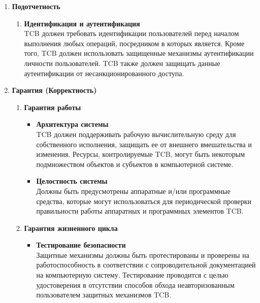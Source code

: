 \begin{enumerate}
\begin{enumerate}
\begin{enumerate}
\begin{enumerate}
				(\textit{напр.} self/group/other контроль, ACL) должны позволять пользователям определять и контролировать общий доступ к объектам именованными субъектами и/или определенной группой
				субъектов.
			\end{enumerate}
			\item{\textbf{Подотчетность}}
			\begin{enumerate}
				\item{\textbf{Идентификация и аутентификация}}\\
				TCB должен требовать идентификации пользователей перед началом выполнения любых операций, посредником в которых является. Кроме того, TCB должен использовать защищенные механизмы
				аутентификации личности пользователей. TCB также должен защищать данные аутентификации от несанкционированного доступа.
			\end{enumerate}
			\item{\textbf{Гарантия (Корректность)}}
			\begin{enumerate}
				\item{\textbf{Гарантия работы}}
				\begin{itemize}
					\item{\textbf{Архитектура системы}}\\
					TCB должен поддерживать рабочую вычислительную среду для собственного исполнения, защищать ее от внешнего вмешательства и изменения. Ресурсы, контролируемые TCB, могут быть
					некоторым подмножеством объектов и субъектов в компьютерной системе.
					\item{\textbf{Целостность системы}}\\
					Должны быть предусмотрены аппаратные и/или программные средства, которые могут использоваться для периодической проверки правильности работы аппаратных и программных элементов TCB.
				\end{itemize}
				\item{\textbf{Гарантия жизненного цикла}}
				\begin{itemize}
					\item{\textbf{Тестирование безопасности}}\\
					Защитные механизмы должны быть протестированы и проверены на работоспособность в соответствии с сопроводительной документацией на компьютерную систему.
					Тестирование проводится с целью удостоверения в отсутствии способов обхода неавторизованным пользователем защитных механизмов TCB.
				\end{itemize}
			\end{enumerate}

\end{enumerate}
\end{enumerate}
\end{enumerate}
